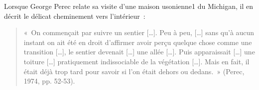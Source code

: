 

Lorsque George Perec relate sa visite d’une maison usonienne1 du
Michigan, il en décrit le délicat cheminement vers l’intérieur :

\begin{quotation}
  « On commençait par suivre un sentier […]. Peu à peu, […] sans qu’à
  aucun instant on ait été en droit d’affirmer avoir perçu quelque
  chose comme une transition […], le sentier devenait […] une allée
  […]. Puis apparaissait […] une toiture […] pratiquement
  indissociable de la végétation […]. Mais en fait, il était déjà trop
  tard pour savoir si l’on était dehors ou dedans. » (Perec, 1974,
  pp. 52-53).
\end{quotation}


